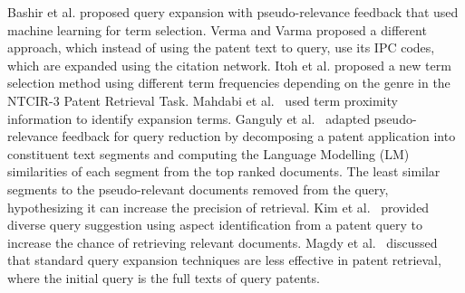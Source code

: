 Bashir et al. \cite{Bashir2010} proposed query expansion with pseudo-relevance
feedback that used machine learning for term selection.
Verma and Varma
\cite{Verma2011} proposed a different approach, which instead of using
the patent text to query, use its IPC codes, which are expanded using the citation network.
Itoh et al. \cite{Itoh2003} proposed a new term selection method using different term
frequencies depending on the genre in the NTCIR-3 Patent Retrieval Task.
Mahdabi et al.~\cite{Mahdabi2013} used term proximity
information to identify expansion terms. Ganguly et
al.~\cite{ganguly2011patent} adapted pseudo-relevance feedback for
query reduction by decomposing a patent application into constituent
text segments and computing the Language Modelling (LM) similarities
of each segment from the top ranked documents. The least similar
segments to the pseudo-relevant documents removed from the query,
hypothesizing it can increase the precision of retrieval. Kim et
al.~\cite{kim2014diversifying} provided diverse query suggestion using
aspect identification from a patent query to increase the chance of
retrieving relevant documents. Magdy et al.~\cite{magdy2011study} 
discussed that standard query expansion techniques are
less effective in patent retrieval, where the initial query is the full texts of query
patents. 












